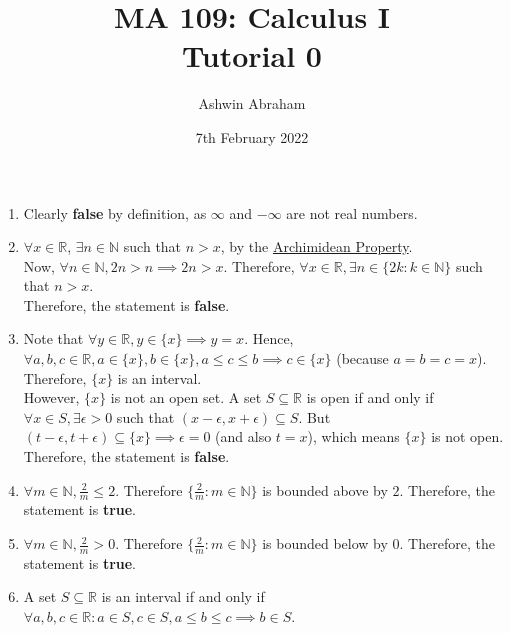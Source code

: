 \documentclass{article}
\title{MA 109: Calculus I\\Tutorial 0}				%
\author{Ashwin Abraham}%
\date{7th February 2022}		%
\begin{document}
\maketitle




\begin{enumerate} 
	\item Clearly \textbf{false} by definition, as $\infty$ and $-\infty$ are not real numbers.
	\item $\forall x \in \mathbb{R}$, $\exists n \in \mathbb{N}$ such that $n > x$, by the \href{https://en.wikipedia.org/wiki/Archimedean_property}{Archimidean Property}.
    \\Now, $\forall n \in \mathbb{N}, 2n > n \implies 2n > x$.
    Therefore, $\forall x \in \mathbb{R}, \exists n \in \{2k : k \in \mathbb{N}\}$ such that $n > x$. \\Therefore, the statement is \textbf{false}.
	\item Note that $\forall y \in \mathbb{R}, y \in \{x\} \implies y = x$.
	Hence, $\forall a, b,c \in \mathbb{R}, a \in \{x\}, b \in \{x\}, a \leq c \leq b \implies c \in \{x\}$ (because $a = b = c = x$).
	Therefore, $\{x\}$ is an interval.
	\\However, $\{x\}$ is not an open set. A set $S \subseteq \mathbb{R}$ is open if and only if $\forall x \in S, \exists \epsilon > 0$ such that $(x - \epsilon, x + \epsilon) \subseteq S$.
	But $(t - \epsilon, t + \epsilon) \subseteq \{x\} \implies \epsilon = 0$ (and also $t = x$), which means $\{x\}$ is not open.
	\\Therefore, the statement is \textbf{false}.
	\item $\forall m \in \mathbb{N}, \frac{2}{m} \leq 2$. Therefore $\{\frac{2}{m}: m \in \mathbb{N}\}$ is bounded above by $2$. Therefore, the statement is \textbf{true}.
	\item $\forall m \in \mathbb{N}, \frac{2}{m} > 0$. Therefore $\{\frac{2}{m}: m \in \mathbb{N}\}$ is bounded below by $0$. Therefore, the statement is \textbf{true}.
	\item A set $S \subseteq \mathbb{R}$ is an interval if and only if $\forall a, b, c \in \mathbb{R}: a \in S, c \in S, a \leq b \leq c \implies b \in S$.

\end{enumerate}
\end{document}

